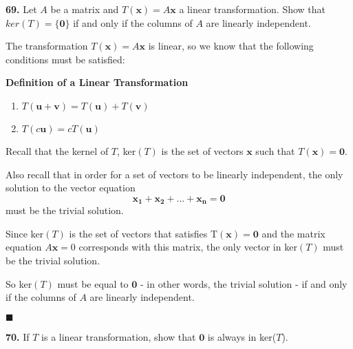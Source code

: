 \documentclass[12pt]{article}
\renewcommand{\vec}[1]{\mathbf{#1}}
\begin{document}
\textbf{69.}  Let $A$ be a matrix and $T(\vec{x}) = A\vec{x}$ a linear transformation. Show that $ker(T) = \{\vec{0}\}$ if and only if the columns of $A$ are linearly independent.

\begin{lin-proof}

The transformation $T(\vec{x}) = A\vec{x}$ is linear, so we know that the following conditions must be satisfied:~\\

\begin{elaboration}
\textbf{Definition of a Linear Transformation}
\begin{enumerate}[label=\alph*)]
\item $T(\vec{u} + \vec{v}) = T(\vec{u}) + T(\vec{v})$

\item $T(c\vec{u}) = cT(\vec{u})$
\end{enumerate}

\end{elaboration}

Recall that the kernel of $T$, ker$(T)$ is the set of vectors $\vec{x}$ such that $T(\vec{x}) = \vec{0}$.

Also recall that in order for a set of vectors to be linearly independent, the only solution to the vector equation
$$\vec{x_1} + \vec{x_2} + \dots + \vec{x_n} = \vec{0}$$ must be the trivial solution. 

Since ker$(T)$ is the set of vectors that satisfies T$(\vec{x}) = \vec{0}$ and the matrix equation $A\vec{x} = 0$ corresponds with this matrix, the only vector in ker$(T)$ must be the trivial solution.

So ker$(T)$ must be equal to $\vec{0}$ - in other words, the trivial solution - if and only if the columns of $A$ are linearly independent.
 \begin{flushright}$\blacksquare$ \end{flushright}
\end{lin-proof}
\pagebreak
\textbf{70.} If $T$ is a linear transformation, show that $\vec{0}$ is always in ker($T$).
\end{document}
